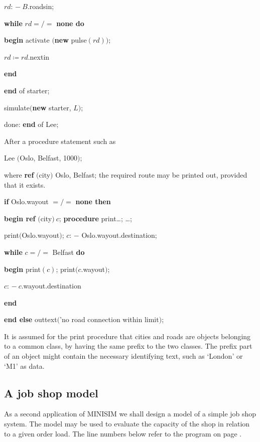 \documentclass[twoside,11pt]{book}
\begin{document}
\quad \quad \quad \quad \quad $rd$: $-\ B$.roadsin;

\quad \quad \quad \quad \quad \textbf{while} $rd =/=$ \textbf{none do}

\quad \quad \quad \quad \quad \quad \textbf{begin} activate $($\textbf{new} pulse$(rd))$;

\quad \quad \quad \quad \quad \quad \quad \quad $rd \coloneq rd$.nextin

\quad \quad \quad \quad \quad \quad \textbf{end}

\quad \quad \quad \quad \textbf{end} of starter;

\quad \quad \quad \quad simulate$($\textbf{new} starter, $L)$;

\quad \quad done: \textbf{end} of Lee;

\noindent
After a procedure statement such as

\quad Lee $($Oslo, Belfast, 1000$)$;

\noindent
where \textbf{ref} $($city$)$ Oslo, Belfast; the required route may be printed out, provided that it exists.

\quad \textbf{if} Oslo.wayout $=/=$ \textbf{none then}

\quad \textbf{begin ref} $($city$)\ c$; \textbf{procedure} print\dots; \dots;

\quad \quad print$($Oslo.wayout$)$; $c$: $-$ Oslo.wayout.destination;

\quad \quad \textbf{while} $c =/=$ Belfast \textbf{do}

\quad \quad \textbf{begin} print$(c)$; print$(c$.wayout$)$;

\quad \quad \quad $c$: $-\ c$.wayout.destination

\quad \quad \textbf{end}

\quad \textbf{end else} outtext$($'no road connection within limit$)$;

\noindent
It is assumed for the print procedure that cities and roads are objects belonging to a common class, by having the same prefix to the two classes. The prefix part of an object might contain the necessary identifying text, such as `London' or `M1' as data.

\subsection{A job shop model}

As a second application of MINISIM we shall design a model of a simple job shop system. The model may be used to evaluate the capacity of the shop in relation to a given order load. The line numbers below refer to the program on page \pageref{pg:program-job-shop}.
\end{document}
